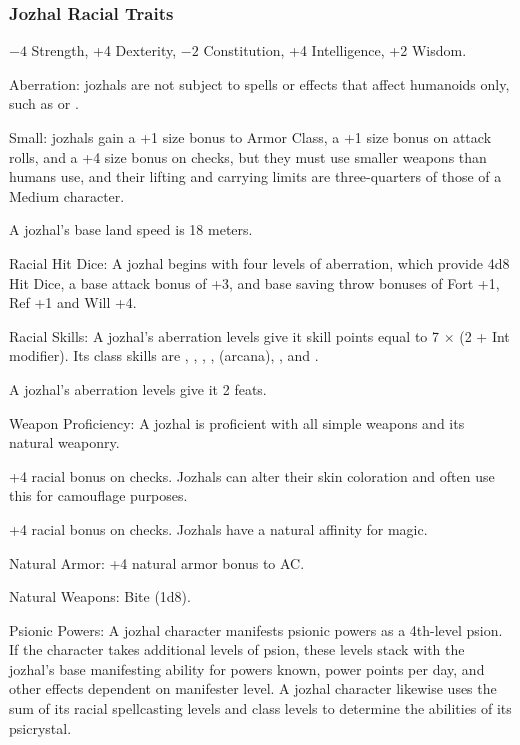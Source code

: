 \subsubsection{Jozhal Racial Traits}
\begin{itemize*}
    \item $-4$ Strength, +4 Dexterity, $-2$ Constitution, +4 Intelligence, +2 Wisdom.
    \item Aberration: jozhals are not subject to spells or effects that affect humanoids only, such as  or .
    \item Small: jozhals gain a +1 size bonus to Armor Class, a	+1 size bonus on attack rolls, and a +4 size bonus on  checks, but they must use smaller weapons than humans use, and their lifting and carrying limits are three-quarters of those of a Medium character.
    \item A jozhal's base land speed is 18 meters.
    \item Racial Hit Dice: A jozhal begins with four levels of aberration, which provide 4d8 Hit Dice, a base attack bonus of +3, and base saving throw bonuses of Fort +1, Ref +1 and Will +4.
    \item Racial Skills: A jozhal's aberration levels give it skill points equal to 7 $\times$ (2 + Int modifier). Its class skills are , , , ,  (arcana), , and .
    \item A jozhal's aberration levels give it 2 feats.
    \item Weapon Proficiency: A jozhal is proficient with all simple weapons and its natural weaponry.
    \item +4 racial bonus on  checks. Jozhals can alter their skin coloration and often use this for camouflage purposes.
    \item +4 racial bonus on  checks. Jozhals have a natural affinity for magic.
    \item Natural Armor: +4 natural armor bonus to AC.
    \item Natural Weapons: Bite (1d8).
    \item Psionic Powers: A jozhal character manifests psionic powers as a 4th-level psion. If the character takes additional levels of psion, these levels stack with the jozhal's base manifesting ability for powers known, power points per day, and other effects dependent on manifester level. A jozhal character likewise uses the sum of its racial spellcasting levels and class levels to determine the abilities of its psicrystal.

\end{itemize*}
